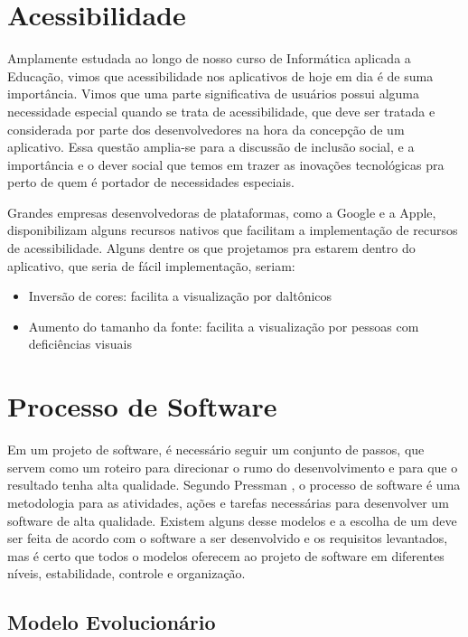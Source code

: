 \section{Acessibilidade}
Amplamente estudada ao longo de nosso curso de Informática aplicada a Educação, vimos que acessibilidade nos aplicativos de hoje em dia é de suma importância. Vimos que uma parte significativa de usuários possui alguma necessidade especial quando se trata de acessibilidade, que deve ser tratada e considerada por parte dos desenvolvedores na hora da concepção de um aplicativo. Essa questão amplia-se para a discussão de inclusão social, e a importância e o dever social que temos em trazer as inovações tecnológicas pra perto de quem é portador de necessidades especiais.

Grandes empresas desenvolvedoras de plataformas, como a Google e a Apple, disponibilizam alguns recursos nativos que facilitam a implementação de recursos de acessibilidade. Alguns dentre os que projetamos pra estarem dentro do aplicativo, que seria de fácil implementação, seriam:

\begin{itemize}
	\item Inversão de cores: facilita a visualização por daltônicos
	\item Aumento do tamanho da fonte: facilita a visualização por pessoas com deficiências visuais
\end{itemize}

\section{Processo de Software}

Em um projeto de software, é necessário seguir um conjunto de passos, que servem como um roteiro para direcionar o rumo do desenvolvimento e para que o resultado tenha alta qualidade. Segundo Pressman \cite{pressman2016engenharia}, o processo de software é uma metodologia para as atividades, ações e tarefas necessárias para desenvolver um software de alta qualidade. Existem alguns desse modelos e a escolha de um deve ser feita de acordo com o software a ser desenvolvido e os requisitos levantados, mas é certo que todos o modelos oferecem ao projeto de software em diferentes níveis, estabilidade, controle e organização.

\subsection{Modelo Evolucionário} 

